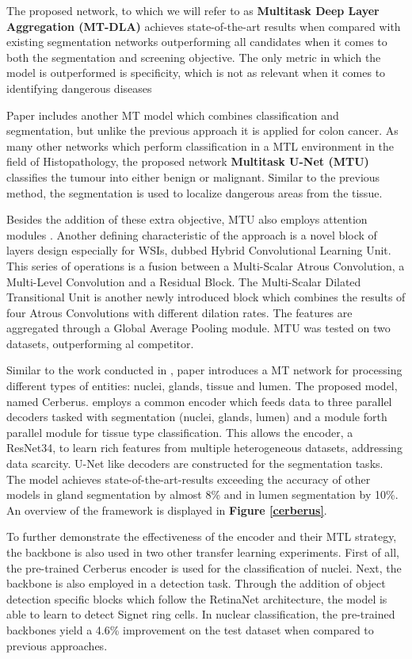 \documentclass[conference]{IEEEtran}
\begin{document}
The proposed network, to which we will refer to as \textbf{Multitask Deep Layer Aggregation (MT-DLA)} achieves state-of-the-art results when compared with existing segmentation networks outperforming all candidates when it comes to both the segmentation and screening objective. The only metric in which the model is outperformed is specificity, which is not as relevant when it comes to identifying dangerous diseases

Paper \cite{dabass2022mtu} includes another MT model which combines classification and segmentation, but unlike the previous approach it is applied for colon cancer. As many other networks which perform classification in a MTL environment in the field of Histopathology, the proposed network \textbf{Multitask U-Net (MTU)} classifies the tumour into either benign or malignant. Similar to the previous method, the segmentation is used to localize dangerous areas from the tissue. 

Besides the addition of these extra objective, MTU also employs attention modules \cite{vaswani2017attention}. Another defining characteristic of the approach is a novel block of layers design especially for WSIs, dubbed Hybrid Convolutional Learning Unit. This series of operations is a fusion between a Multi-Scalar Atrous Convolution, a Multi-Level Convolution and a Residual Block. The Multi-Scalar Dilated Transitional Unit is another newly introduced block which combines the results of four Atrous Convolutions with different dilation rates. The features are aggregated through a Global Average Pooling module. MTU was tested on two datasets, outperforming al competitor.

Similar to the work conducted in \cite{dabass2022mtu}, paper \cite{graham2023one} introduces a MT network for processing different types of entities: nuclei, glands, tissue and lumen. The proposed model, named Cerberus. employs a common encoder which feeds data to three parallel decoders tasked with segmentation (nuclei, glands, lumen) and a module forth parallel module for tissue type classification. This allows the encoder, a ResNet34, to learn rich features from multiple heterogeneous datasets, addressing data scarcity. U-Net like decoders are constructed for the segmentation tasks. The model achieves state-of-the-art-results exceeding the accuracy of other models in gland segmentation by almost 8\% and in lumen segmentation by 10\%. An overview of the framework is displayed in \textbf{Figure \ref{cerberus}}.


To further demonstrate the effectiveness of the encoder and their MTL strategy, the backbone is also used in two other transfer learning experiments. First of all, the pre-trained Cerberus encoder is used for the classification of nuclei. Next, the backbone is also employed in a detection task. Through the addition of object detection specific blocks which follow the RetinaNet \cite{lin2017focal} architecture, the model is able to learn to detect Signet ring cells. In nuclear classification, the pre-trained backbones yield a 4.6\% improvement on the test dataset when compared to previous approaches.
\end{document}
